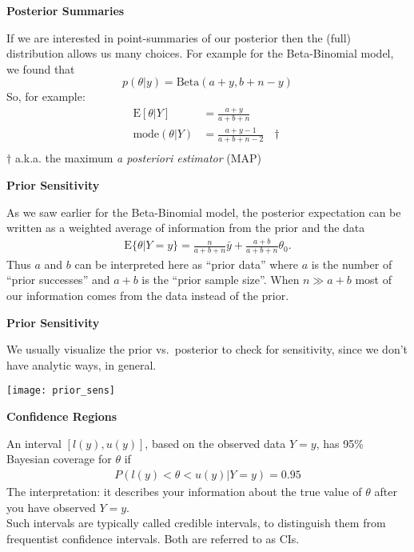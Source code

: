 \documentclass[12pt,xcolor=svgnames]{beamer}
\newcommand{\bl}{\color{blue}}
\newcommand{\theme}{\color{FireBrick}}
\newcommand{\mr}[1]{\mathrm{#1}}
\newcommand{\sk}{\vspace{.4cm}}
\newcommand{\chap}[1]{{\theme \Large \bf #1} \sk}
\begin{document}
\begin{frame}
\chap{Posterior Summaries}

If we are interested in point-summaries of our posterior then the (full) distribution allows us many choices. For example for the Beta-Binomial model, we found that
\begin{equation*}
p(\theta | y)=\mr{Beta}(a+y, b+n-y)
\end{equation*}
So, for example:
\begin{align*}
\mr{E}[\theta|Y] & = \frac{a+y}{a+b+n} \\
\mr{mode}(\theta|Y) & = \frac{a+y-1}{a+b+n-2} ~~~ \dagger \\
\end{align*}
\vspace{0.25cm}
\hfill {\bl \footnotesize $\dagger$ a.k.a. the maximum {\em a posteriori estimator} (MAP)}
\end{frame}


\begin{frame}
\chap{Prior Sensitivity}

As we saw earlier for the Beta-Binomial model, the posterior expectation can be written as a weighted average of information from the prior and the data
\begin{align*}
\mr{E}\{\theta|Y=y\} =   \frac{n}{a + b +n} \bar{y} + \frac{a+b}{a+b+n} \theta_0.
\end{align*}
Thus $a$ and $b$ can be interpreted here as ``prior data'' where $a$ is the number of ``prior successes'' and $a+b$ is the ``prior sample size''. When $n\gg a+b$ most of our information comes from the data instead of the prior. 
\end{frame}

\begin{frame}
\chap{Prior Sensitivity}

We usually visualize the prior vs.~posterior to check for sensitivity, since we don't have analytic ways, in general. 
\begin{center}
\texttt{[image: prior\_sens]}
\end{center}
\end{frame}


\begin{frame}
\chap{Confidence Regions}

An interval $[l(y), u(y)]$, based on the observed data $Y=y$, has 95\% Bayesian coverage for $\theta$ if
\begin{align*}
P(l(y) <\theta < u(y)|Y=y)=0.95
\end{align*}
The interpretation: it describes your information about the true value of $\theta$ after you have observed $Y=y$.\\

\sk
Such intervals are typically called {\bl credible intervals}, to distinguish them from frequentist confidence intervals. Both are referred to as CIs. 

\end{frame}
\end{document}
